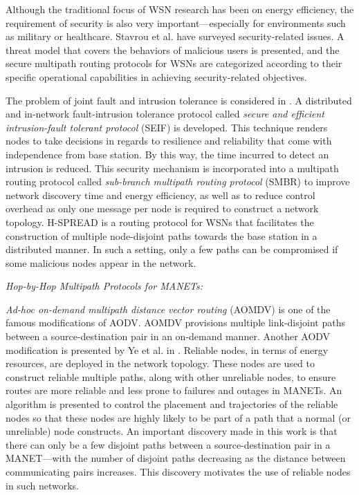 \documentclass[10pt]{IEEEtran}
\begin{document}
Although the traditional focus of WSN research has been on energy efficiency, the requirement of security is also very important---especially for environments such as military or healthcare. Stavrou et al. \cite{stavrou2010survey} have surveyed security-related issues. A threat model that covers the behaviors of malicious users is presented, and the secure multipath routing protocols for WSNs are categorized according to their specific operational capabilities in achieving security-related objectives.

The problem of joint fault and intrusion tolerance is considered in \cite{challal2011secure}. A distributed and in-network fault-intrusion tolerance protocol called \textit{secure and efficient intrusion-fault tolerant protocol} (SEIF) is developed. This technique renders nodes to take decisions in regards to resilience and reliability that come with independence from base station. By this way, the time incurred to detect an intrusion is reduced. This security mechanism is incorporated into a multipath routing protocol called \textit{sub-branch multipath routing protocol} (SMBR) to improve network discovery time and energy efficiency, as well as to reduce control overhead as only one message per node is required to construct a network topology. H-SPREAD \cite{lou2006h} is a routing protocol for WSNs that facilitates the construction of multiple node-disjoint paths towards the base station in a distributed manner. In such a setting, only a few paths can be compromised if some malicious nodes appear in the network.

\vspace{2mm}
\textit{Hop-by-Hop Multipath Protocols for MANETs:}
\vspace{1mm}


\textit{Ad-hoc on-demand multipath distance vector routing} (AOMDV) \cite{marina2001demand} is one of the famous modifications of AODV. AOMDV provisions multiple link-disjoint paths between a source-destination pair in an on-demand manner. Another AODV modification is presented  by Ye et al. in \cite{ye2003framework}. Reliable nodes, in terms of energy resources, are deployed in the network topology. These nodes are used to construct reliable multiple paths, along with other unreliable nodes, to ensure routes are more reliable and less prone to failures and outages in MANETs. An algorithm is presented to control the placement and trajectories of the reliable nodes so that these nodes are highly likely to be part of a path that a normal (or unreliable) node constructs. An important discovery made in this work is that there can only be a few disjoint paths between a source-destination pair in a MANET---with the number of disjoint paths decreasing as the distance between communicating pairs increases. This discovery motivates the use of reliable nodes in such networks.
\end{document}

